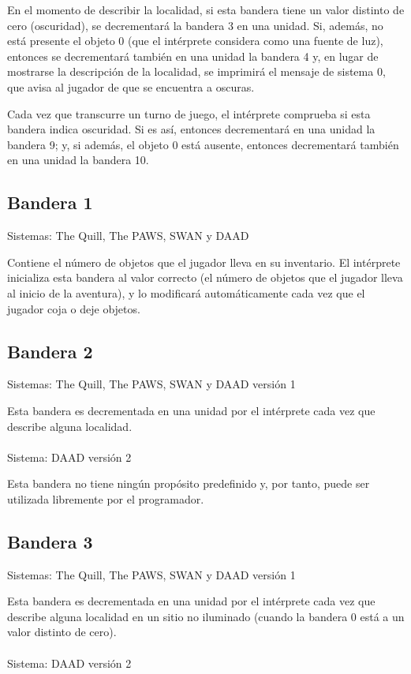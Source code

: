 \documentclass[11pt, a5paper]{article}
\newcommand{\quill}{\textsf{The Quill}\xspace}
\newcommand{\paw}{\textsf{The PAWS}\xspace}
\newcommand{\swan}{\textsf{SWAN}\xspace}
\newcommand{\daad}{\textsf{DAAD}\xspace}
\newcommand{\sistema}[1]{\noindent Sistema: #1 \nopagebreak}
\newcommand{\sistemas}[1]{\noindent Sistemas: #1 \nopagebreak}
\begin{document}
En el momento de describir la localidad, si esta bandera tiene un valor distinto de cero (oscuridad), se decrementará la bandera 3 en una unidad. Si, además, no está presente el objeto 0 (que el intérprete considera como una fuente de luz), entonces se decrementará también en una unidad la bandera 4 y, en lugar de mostrarse la descripción de la localidad, se imprimirá el mensaje de sistema 0, que avisa al jugador de que se encuentra a oscuras.

Cada vez que transcurre un turno de juego, el intérprete comprueba si esta bandera indica oscuridad. Si es así, entonces decrementará en una unidad la bandera 9; y, si además, el objeto 0 está ausente, entonces decrementará también en una unidad la bandera 10.

\subsection{Bandera 1}\label{flag1}

\sistemas{\quill, \paw, \swan y \daad}

Contiene el número de objetos que el jugador lleva en su inventario. El intérprete inicializa esta bandera al valor correcto (el número de objetos que el jugador lleva al inicio de la aventura), y lo modificará automáticamente cada vez que el jugador coja o deje objetos.

\subsection{Bandera 2}

\sistemas{\quill, \paw, \swan y \daad versión 1}

Esta bandera es decrementada en una unidad por el intérprete cada vez que describe alguna localidad.
\\\ \\
\sistema{\daad versión 2}

Esta bandera no tiene ningún propósito predefinido y, por tanto, puede ser utilizada libremente por el programador.

\subsection{Bandera 3}

\sistemas{\quill, \paw, \swan y \daad versión 1}

Esta bandera es decrementada en una unidad por el intérprete cada vez que describe alguna localidad en un sitio no iluminado (cuando la bandera 0 está a un valor distinto de cero).
\\\ \\
\sistema{\daad versión 2}
\end{document}
